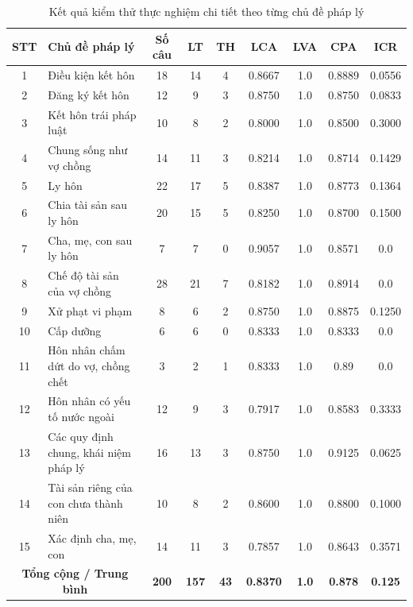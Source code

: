\documentclass[../DoAn.tex]{subfiles}
\begin{document}
\begin{table}[H]
\centering
\small
\begin{tabular}{|c|p{3cm}|c|c|c|c|c|c|c|}
\hline
\textbf{STT} & \textbf{Chủ đề pháp lý} & \textbf{Số câu} & \textbf{LT} & \textbf{TH} & \textbf{LCA} & \textbf{LVA} & \textbf{CPA} & \textbf{ICR} \\ \hline

1 & Điều kiện kết hôn & 18 & 14 & 4 & 0.8667 & 1.0 & 0.8889 & 0.0556 \\ \hline
2 & Đăng ký kết hôn & 12 & 9 & 3 & 0.8750 & 1.0 & 0.8750 & 0.0833 \\ \hline
3 & Kết hôn trái pháp luật & 10 & 8 & 2 & 0.8000 & 1.0 & 0.8500 & 0.3000 \\ \hline
4 & Chung sống như vợ chồng & 14 & 11 & 3 & 0.8214 & 1.0 & 0.8714 & 0.1429 \\ \hline
5 & Ly hôn & 22 & 17 & 5 & 0.8387 & 1.0 & 0.8773 & 0.1364 \\ \hline
6 & Chia tài sản sau ly hôn & 20 & 15 & 5 & 0.8250 & 1.0 & 0.8700 & 0.1500 \\ \hline
7 & Cha, mẹ, con sau ly hôn & 7 & 7 & 0 & 0.9057 & 1.0 & 0.8571 & 0.0 \\ \hline
8 & Chế độ tài sản của vợ chồng & 28 & 21 & 7 & 0.8182 & 1.0 & 0.8914 & 0.0 \\ \hline
9 & Xử phạt vi phạm & 8 & 6 & 2 & 0.8750 & 1.0 & 0.8875 & 0.1250 \\ \hline
10 & Cấp dưỡng & 6 & 6 & 0 & 0.8333 & 1.0 & 0.8333 & 0.0 \\ \hline
11 & Hôn nhân chấm dứt do vợ, chồng chết & 3 & 2 & 1 & 0.8333 & 1.0 & 0.89 & 0.0 \\ \hline
12 & Hôn nhân có yếu tố nước ngoài & 12 & 9 & 3 & 0.7917 & 1.0 & 0.8583 & 0.3333 \\ \hline
13 & Các quy định chung, khái niệm pháp lý & 16 & 13 & 3 & 0.8750 & 1.0 & 0.9125 & 0.0625 \\ \hline
14 & Tài sản riêng của con chưa thành niên & 10 & 8 & 2 & 0.8600 & 1.0 & 0.8800 & 0.1000 \\ \hline
15 & Xác định cha, mẹ, con & 14 & 11 & 3 & 0.7857 & 1.0 & 0.8643 & 0.3571 \\ \hline

\multicolumn{2}{|c|}{\textbf{Tổng cộng / Trung bình}} & \textbf{200} & \textbf{157} & \textbf{43} & \textbf{0.8370} & \textbf{1.0} & \textbf{0.878} & \textbf{0.125} \\ \hline
\end{tabular}
\caption{Kết quả kiểm thử thực nghiệm chi tiết theo từng chủ đề pháp lý}
\label{table:experimental_results}
\end{table}
\end{document}
